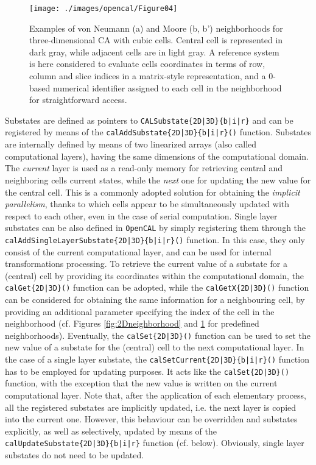 \begin{figure}[!htbp]
	\begin{center}
		\texttt{[image: ./images/opencal/Figure04]}
		\caption{Examples of von Neumann (a) and Moore (b, b') neighborhoods for
			three-dimensional CA with cubic cells. Central cell is represented in
			dark gray, while adjacent cells are in light gray. A reference system
			is here considered to evaluate cells coordinates in terms of row,
			column and slice indices in a matrix-style representation, and a
			0-based numerical identifier assigned to each cell in the neighborhood
			for straightforward access.}
		\label{fig:3Dneighborhood}
	\end{center}
\end{figure}
Substates are defined as pointers to
\verb'CALSubstate{2D|3D}{b|i|r}' and can be registered by means of
the \verb'calAddSubstate{2D|3D}{b|i|r}()' function. Substates are
internally defined by means of two linearized arrays (also called
computational layers), having the same dimensions of the
computational domain. The \emph{current} layer is used as a
read-only memory for retrieving central and neighboring cells
current states, while the \emph{next} one for updating the new value
for the central cell. This is a commonly adopted solution for
obtaining the \emph{implicit parallelism}, thanks to which cells
appear to be simultaneously updated with respect to each other, even
in the case of serial computation. Single layer substates can be
also defined in \texttt{OpenCAL} by simply registering them through the
\verb'calAddSingleLayerSubstate{2D|3D}{b|i|r}()' function. In this
case, they only consist of the current computational layer, and can
be used for internal transformations processing. To retrieve the
current value of a substate for a (central) cell by providing its
coordinates within the computational domain, the
\verb'calGet{2D|3D}()' function can be adopted, while the
\verb'calGetX{2D|3D}()' function can be considered for obtaining the
same information for a neighbouring cell, by providing an additional
parameter specifying the index of the cell in the neighborhood
(cf. Figures \ref{fig:2Dneighborhood} and \ref{fig:3Dneighborhood}
for predefined neighborhoods). Eventually, the
\verb'calSet{2D|3D}()' function can be used to set the new value of
a substate for the (central) cell to the next computational
layer. In the case of a single layer substate, the
\verb'calSetCurrent{2D|3D}{b|i|r}()' function has to be employed for
updating purposes. It acts like the \verb'calSet{2D|3D}()' function,
with the exception that the new value is written on the current
computational layer. Note that, after the application of each
elementary process, all the registered substates are implicitly
updated, i.e. the next layer is copied into the current
one. However, this behaviour can be overridden and substates
explicitly, as well as selectively, updated by means of the
\verb'calUpdateSubstate{2D|3D}{b|i|r}' function
(cf. below). Obviously, single layer substates do not need to be
updated.

